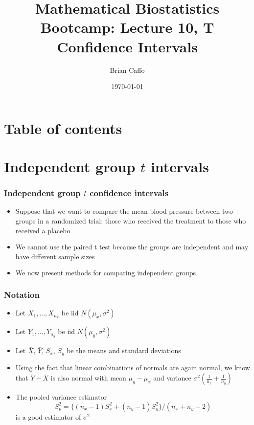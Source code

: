 \documentclass[aspectratio=169]{beamer}
\title{Mathematical Biostatistics Bootcamp: Lecture 10, T Confidence Intervals}
\author{Brian Caffo}
\date{\today}
\institute[Department of Biostatistics]{
  Department of Biostatistics \\
  Johns Hopkins Bloomberg School of Public Health\\
  Johns Hopkins University
}
\begin{document}
\frame{\titlepage}


\section{Table of contents}

\section{Independent group $t$ intervals}
\begin{frame}\frametitle{Independent group $t$ confidence intervals}
  \begin{itemize}
  \item Suppose that we want to compare the mean blood pressure between
    two groups in a randomized trial; those who received the treatment
    to those who received a placebo
  \item We cannot use the paired t test because the groups are independent
    and may have different sample sizes
  \item We now present methods for comparing independent groups
  \end{itemize}
\end{frame}

\begin{frame}\frametitle{Notation}
  \begin{itemize}
  \item Let $X_1,\ldots,X_{n_x}$ be iid $N(\mu_x,\sigma^2)$
  \item Let $Y_1,\ldots,Y_{n_y}$ be iid $N(\mu_y, \sigma^2)$
  \item Let $\bar X$, $\bar Y$, $S_x$, $S_y$ be the means and standard deviations
  \item Using the fact that linear combinations of normals are again normal, we
    know that $\bar Y - \bar X$ is also normal with mean $\mu_y - \mu_x$ and
    variance $\sigma^2 (\frac{1}{n_x} + \frac{1}{n_y})$
  \item The pooled variance estimator
    $$S_p^2 = \{(n_x - 1) S_x^2 + (n_y - 1) S_y^2\}/(n_x + n_y - 2)$$ 
    is a good estimator of $\sigma^2$
  \end{itemize}
\end{frame}
\end{document}
